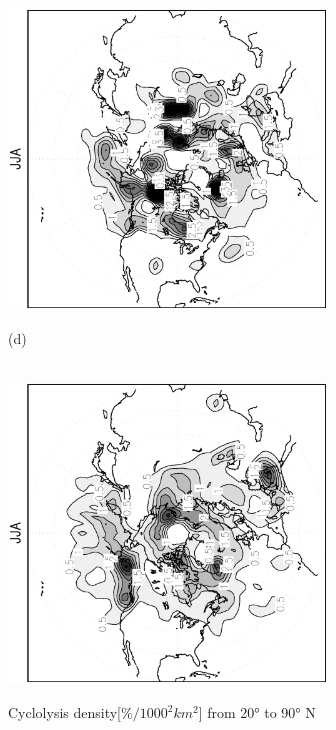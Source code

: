 \documentclass[12pt,a4paper,twoside,openright,headinclude,liststotoc,bibtotoc]{scrreprt}
\begin{document}
\begin{appendix}
\begin{figure}[b]
{\includegraphics[height=8.0cm,angle=-90]
{eps/cycllys_PLASIM_T21_45JJA.eps}
}
\parbox{8.5cm}{\hspace{0.95cm}\begin{scriptsize}(d)\end{scriptsize} \vspace{-0.5cm} \\
\includegraphics[height=8.0cm,angle=-90]
{eps/cycllys_ERA40_T21_45JJA.eps}
}
\caption[Cyclolysis density Northern Hemisphere]{Cyclolysis density[$\%/1000^2 km^2$] from 20° to 90° N}
\label{img:NHcycllys}
\end{figure}



\end{appendix}
\end{document}
